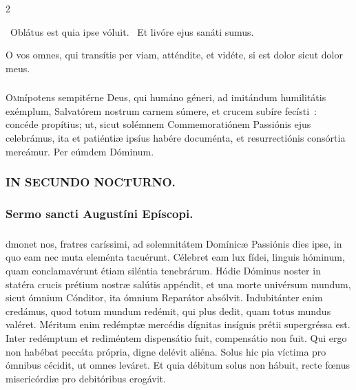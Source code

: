 \documentclass[9pt,twoside]{extarticle}
\begin{document}
\begin{multicols}{2}
\begin{tightlist}{}
\item {}~Oblátus est quia ipse vóluit. ~Et livóre ejus sanáti sumus.
\item {} O vos omnes, qui transítis per viam, atténdite, et vidéte, si est dolor sicut dolor meus.
\end{tightlist}

\subsubsection*{\center {}}
\lettrine{O}mnípotens sempitérne Deus, qui humáno géneri, ad imitándum humilitátis exémplum, Salvatórem nostrum carnem súmere, et crucem subíre fecísti~: concéde propítius; ut, sicut solémnem Commemoratiónem Passiónis ejus celebrámus, ita et patiéntiæ ipsíus habére documénta, et resurrectiónis consórtia mereámur. Per eúmdem Dóminum.

\begin{tightlist}{}
\item {}
\item {}
\end{tightlist}

\subsubsection*{\center \textsc{IN SECUNDO NOCTURNO.}}

\subsubsection*{\center Sermo sancti Augustíni Epíscopi.}
\subsubsection*{\center {}}
dmonet nos, fratres caríssimi, ad solemnitátem Domínicæ Passiónis dies ipse, in quo eam nec muta eleménta tacuérunt. Célebret eam lux fídei, linguis hóminum, quam conclamavérunt étiam siléntia tenebrárum. Hódie Dóminus noster in statéra crucis prétium nostræ salútis appéndit, et una morte univérsum mundum, sicut ómnium Cónditor, ita ómnium Reparátor absólvit. Indubitánter enim credámus, quod totum mundum redémit, qui plus dedit, quam totus mundus valéret. Méritum enim redémptæ mercédis dígnitas insígnis prétii supergréssa est. Inter redémptum et rediméntem dispensátio fuit, compensátio non fuit. Qui ergo non habébat peccáta própria, digne delévit aliéna. Solus hic pia víctima pro ómnibus cécidit, ut omnes leváret. Et quia débitum solus non hábuit, recte fœnus misericórdiæ pro debitóribus erogávit.


\end{multicols}
\end{document}
